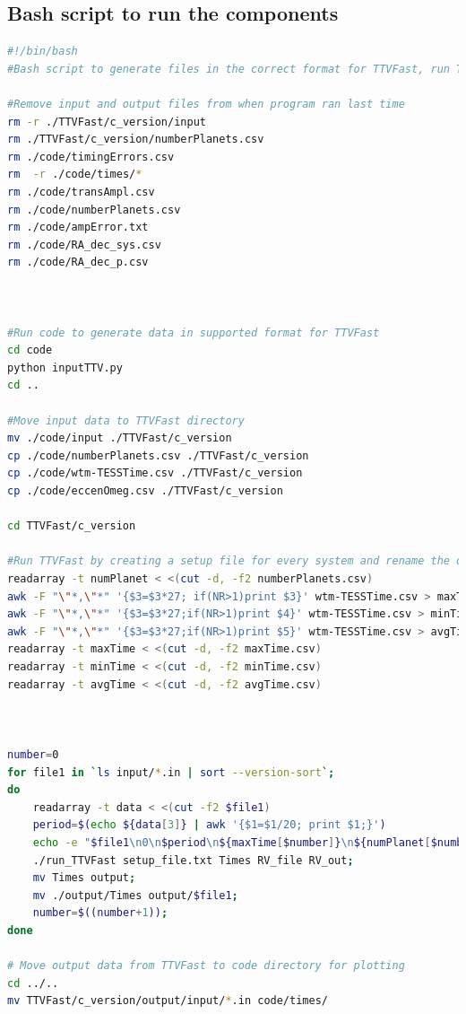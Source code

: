\documentclass[12pt]{report}
\begin{document}


\iffalse
\begin{appendix}

\chapter{Bash script to run the components}
\begin{lstlisting}[language=Bash]
#!/bin/bash
#Bash script to generate files in the correct format for TTVFast, run TTVFast and plot the results

#Remove input and output files from when program ran last time
rm -r ./TTVFast/c_version/input
rm ./TTVFast/c_version/numberPlanets.csv
rm ./code/timingErrors.csv
rm  -r ./code/times/*
rm ./code/transAmpl.csv
rm ./code/numberPlanets.csv
rm ./code/ampError.txt
rm ./code/RA_dec_sys.csv
rm ./code/RA_dec_p.csv



#Run code to generate data in supported format for TTVFast
cd code
python inputTTV.py
cd ..

#Move input data to TTVFast directory
mv ./code/input ./TTVFast/c_version
cp ./code/numberPlanets.csv ./TTVFast/c_version
cp ./code/wtm-TESSTime.csv ./TTVFast/c_version
cp ./code/eccenOmeg.csv ./TTVFast/c_version

cd TTVFast/c_version

#Run TTVFast by creating a setup file for every system and rename the output file to the number of the system
readarray -t numPlanet < <(cut -d, -f2 numberPlanets.csv)
awk -F "\"*,\"*" '{$3=$3*27; if(NR>1)print $3}' wtm-TESSTime.csv > maxTime.csv
awk -F "\"*,\"*" '{$3=$3*27;if(NR>1)print $4}' wtm-TESSTime.csv > minTime.csv
awk -F "\"*,\"*" '{$3=$3*27;if(NR>1)print $5}' wtm-TESSTime.csv > avgTime.csv
readarray -t maxTime < <(cut -d, -f2 maxTime.csv)
readarray -t minTime < <(cut -d, -f2 minTime.csv)
readarray -t avgTime < <(cut -d, -f2 avgTime.csv)



number=0
for file1 in `ls input/*.in | sort --version-sort`;
do
	readarray -t data < <(cut -f2 $file1)
	period=$(echo ${data[3]} | awk '{$1=$1/20; print $1;}')
	echo -e "$file1\n0\n$period\n${maxTime[$number]}\n${numPlanet[$number]}\n0" > setup_file.txt;  		
	./run_TTVFast setup_file.txt Times RV_file RV_out;
	mv Times output;
	mv ./output/Times output/$file1;
	number=$((number+1));
done

# Move output data from TTVFast to code directory for plotting
cd ../..
mv TTVFast/c_version/output/input/*.in code/times/


\end{lstlisting}
\end{appendix}
\end{document}
